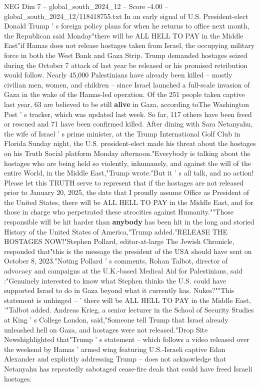 \begin{textsample}{NEG Dim 7 – global\_south\_2024\_12 – Score -4.00 – global\_south\_2024\_12/118418755.txt}  \label{ex:f7_neg_299}
In an early signal of U.S.
President-elect Donald Trump ' s foreign policy plans for when he returns to office next month, the Republican said Monday"there will be ALL HELL TO PAY in the Middle East"if Hamas does not release hostages taken from Israel, the occupying military force in both the West Bank and Gaza Strip.
Trump demanded hostages seized during the October 7 attack of last year be released or his promised retribution would follow.
Nearly 45,000 Palestinians have already been killed -- mostly civilian men, women, and children -- since Israel launched a full-scale invasion of Gaza in the wake of the Hamas-led operation.
Of the 251 people taken captive last year, 63 are believed to be still \textbf{alive} in Gaza, according toThe Washington Post ' s tracker, which was updated last week.
So far, 117 others have been freed or rescued and 71 have been confirmed killed.
After dining with Sara Netanyahu, the wife of Israel ' s prime minister, at the Trump International Golf Club in Florida Sunday night, the U.S. president-elect made his threat about the hostages on his Truth Social platform Monday afternoon."Everybody is talking about the hostages who are being held so violently, inhumanely, and against the will of the entire World, in the Middle East,"Trump wrote."But it ' s all talk, and no action!
Please let this TRUTH serve to represent that if the hostages are not released prior to January 20, 2025, the date that I proudly assume Office as President of the United States, there will be ALL HELL TO PAY in the Middle East, and for those in charge who perpetrated these atrocities against Humanity.""Those responsible will be hit harder than \textbf{anybody} has been hit in the long and storied History of the United States of America,"Trump added."RELEASE THE HOSTAGES NOW!"Stephen Pollard, editor-at-large The Jewish Chronicle, responded that"this is the message the president of the USA should have sent on October 8, 2023."Noting Pollard ' s comments, Rohan Talbot, director of advocacy and campaigns at the U.K.-based Medical Aid for Palestinians, said :"Genuinely interested to know what Stephen thinks the U.S. could have supported Israel to do in Gaza beyond what it currently has.
Nukes?""This statement is unhinged -- ' there will be ALL HELL TO PAY in the Middle East, '"Talbot added.
Andreas Krieg, a senior lecturer in the School of Security Studies at King ' s College London, said,"Someone tell Trump that Israel already unleashed hell on Gaza, and hostages were not released."Drop Site Newshighlighted that"Trump ' s statement -- which follows a video released over the weekend by Hamas ' armed wing featuring U.S.-Israeli captive Edan Alexander and explicitly addressing Trump -- does not acknowledge that Netanyahu has repeatedly sabotaged cease-fire deals that could have freed Israeli hostages.

\end{textsample}
